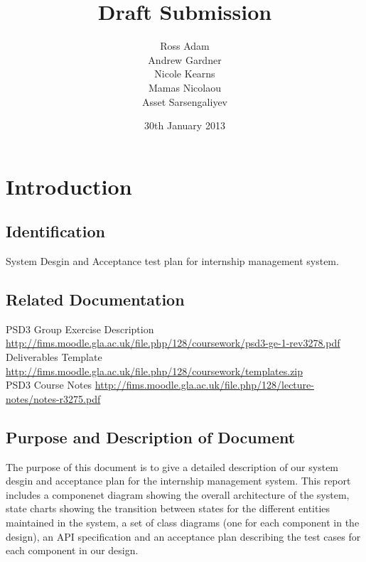 \documentclass{l3deliverable}
\title{Draft Submission}
\author{Ross Adam \\
        Andrew Gardner \\
        Nicole Kearns \\
        Mamas Nicolaou\\
	Asset Sarsengaliyev\\}
\date{30th January 2013}
\begin{document}

\maketitle

\tableofcontents

\newpage


\section{Introduction}

\subsection{Identification}
System Desgin and Acceptance test plan for internship management system.

\subsection{Related Documentation}

PSD3 Group Exercise Description \url{http://fims.moodle.gla.ac.uk/file.php/128/coursework/psd3-ge-1-rev3278.pdf}\\

Deliverables Template \url{http://fims.moodle.gla.ac.uk/file.php/128/coursework/templates.zip}\\

PSD3 Course Notes \url{http://fims.moodle.gla.ac.uk/file.php/128/lecture-notes/notes-r3275.pdf}\\

\subsection{Purpose and Description of Document}
The purpose of this document is to give a detailed description of our
system desgin and acceptance plan for the internship management system. This report includes a componenet diagram showing the overall architecture of the system, state charts showing the transition between states for the different entities maintained in the system, a set of class diagrams (one for each component in the design), an API specification and an acceptance plan describing the test cases for each component in our design.
\end{document}
